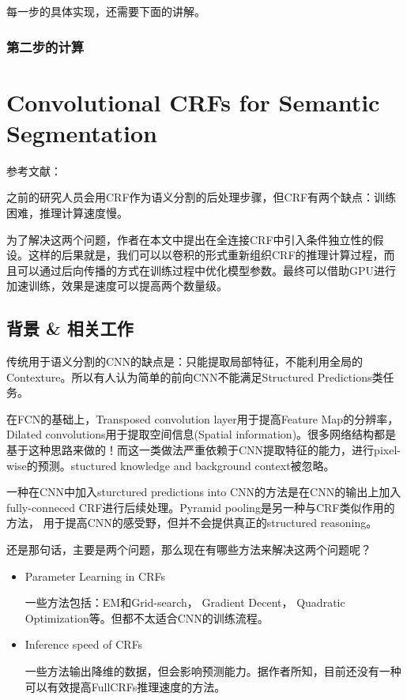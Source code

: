 每一步的具体实现，还需要下面的讲解。

\subsubsection{第二步的计算}







\section{Convolutional CRFs for Semantic Segmentation}

参考文献：\cite{marvin2018crf}

之前的研究人员会用CRF作为语义分割的后处理步骤，但CRF有两个缺点：训练困难，推理计算速度慢。

为了解决这两个问题，作者在本文中提出在全连接CRF中引入条件独立性的假设。这样的后果就是，我们可以以卷积的形式重新组织CRF的推理计算过程，而且可以通过后向传播的方式在训练过程中优化模型参数。最终可以借助GPU进行加速训练，效果是速度可以提高两个数量级。

\subsection{背景 \& 相关工作}

传统用于语义分割的CNN的缺点是：只能提取局部特征，不能利用全局的Contexture。所以有人认为简单的前向CNN不能满足Structured Predictions类任务。

在FCN的基础上，Transposed convolution layer用于提高Feature Map的分辨率，Dilated convolutions用于提取空间信息(Spatial information)。很多网络结构都是基于这种思路来做的！而这一类做法严重依赖于CNN提取特征的能力，进行pixel-wise的预测。stuctured knowledge and background context被忽略。

一种在CNN中加入sturctured predictions into CNN的方法是在CNN的输出上加入fully-conneced CRF进行后续处理。Pyramid pooling是另一种与CRF类似作用的方法， 用于提高CNN的感受野，但并不会提供真正的structured reasoning。

还是那句话，主要是两个问题，那么现在有哪些方法来解决这两个问题呢？
\begin{itemize}
\item Parameter Learning in CRFs

一些方法包括：EM和Grid-search， Gradient Decent， Quadratic Optimization等。但都不太适合CNN的训练流程。

\item Inference speed of CRFs

一些方法输出降维的数据，但会影响预测能力。据作者所知，目前还没有一种可以有效提高FullCRFs推理速度的方法。

\end{itemize}

